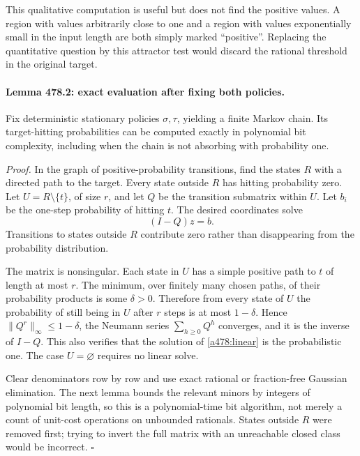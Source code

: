 \documentclass[11pt]{article}
\begin{document}
This qualitative computation is useful but does not find the positive
values. A region with values arbitrarily close to one and a region with
values exponentially small in the input length are both simply marked
``positive''. Replacing the quantitative question by this attractor test
would discard the rational threshold in the original target.

\paragraph{Lemma 478.2: exact evaluation after fixing both policies.}
Fix deterministic stationary policies $\sigma,\tau$, yielding a finite
Markov chain. Its target-hitting probabilities can be computed exactly in
polynomial bit complexity, including when the chain is not absorbing with
probability one.

\emph{Proof.} In the graph of positive-probability transitions, find the
states $R$ with a directed path to the target. Every state outside $R$
has hitting probability zero. Let $U=R\setminus\{t\}$, of size $r$,
and let $Q$ be the transition submatrix within $U$. Let $b_i$ be the
one-step probability of hitting $t$. The desired coordinates solve
\begin{equation}\label{a478:linear}
                             (I-Q)z=b.
\end{equation}
Transitions to states outside $R$ contribute zero rather than disappearing
from the probability distribution.

The matrix is nonsingular. Each state in $U$ has a simple positive path
to $t$ of length at most $r$. The minimum, over finitely many chosen
paths, of their probability products is some $\delta>0$. Therefore
from every state of $U$ the probability of still being in $U$ after
$r$ steps is at most $1-\delta$. Hence
$\|Q^r\|_\infty\leq1-\delta$, the Neumann series
$\sum_{h\geq0}Q^h$ converges, and it is the inverse of $I-Q$.
This also verifies that the solution of \eqref{a478:linear} is the
probabilistic one. The case $U=\varnothing$ requires no linear solve.

Clear denominators row by row and use exact rational or fraction-free
Gaussian elimination. The next lemma bounds the relevant minors by
integers of polynomial bit length, so this is a polynomial-time bit
algorithm, not merely a count of unit-cost operations on unbounded
rationals. States outside $R$ were removed first; trying to invert the
full matrix with an unreachable closed class would be incorrect.
\hfill$\square$
\end{document}
